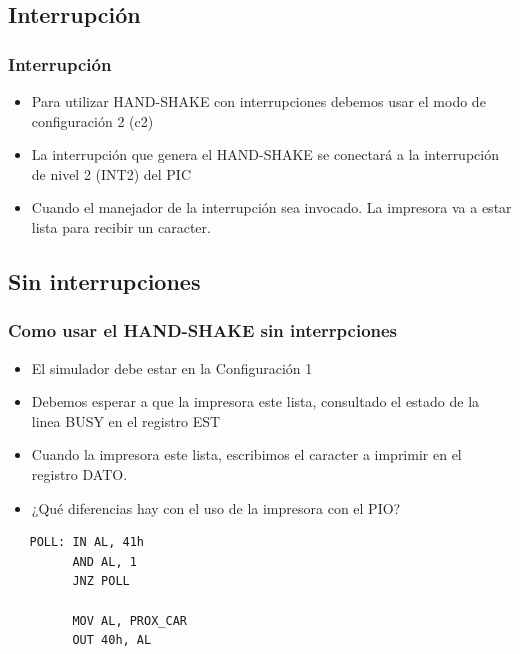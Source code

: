 \documentclass{beamer}
\begin{document}
\subsection{Interrupción}
\begin{frame}
\frametitle{Interrupción}
\begin{itemize}
 \item Para utilizar HAND-SHAKE con interrupciones debemos usar el modo de configuración 2 (c2)

 \item La interrupción que genera el HAND-SHAKE se conectará a la interrupción de nivel 2 (INT2) del PIC

 \item Cuando el manejador de la interrupción sea invocado. La impresora va a estar lista para recibir un caracter.
\end{itemize}
\end{frame}


\subsection{Sin interrupciones}
\begin{frame}[fragile]
\frametitle{Como usar el HAND-SHAKE sin interrpciones}
\begin{itemize}
 \item El simulador debe estar en la Configuración 1
 \item Debemos esperar a que la impresora este lista, consultado el estado de la linea BUSY en el registro EST
 \item Cuando la impresora este lista, escribimos el caracter a imprimir en el registro DATO.
 \item ¿Qué diferencias hay con el uso de la impresora con el PIO?
\end{itemize}

\begin{block}{}
 \begin{verbatim}
   POLL: IN AL, 41h
         AND AL, 1
         JNZ POLL

         MOV AL, PROX_CAR
         OUT 40h, AL
 \end{verbatim}
\end{block}

\end{frame}
\end{document}
